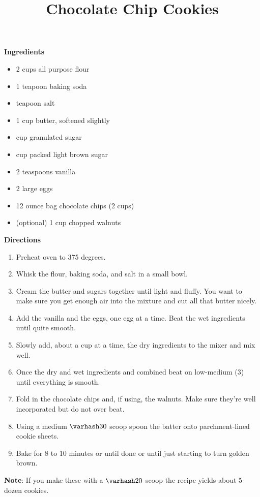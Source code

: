 \documentclass{article}
\title{Chocolate Chip Cookies}
\begin{document}
\textbf{Ingredients}

\begin{multicols}{2}

      \begin{itemize}
            \item 2 cups all purpose flour
            \item 1 teapoon baking soda
            \item {} teapoon salt

            \item 1 cup butter, softened slightly
            \item {} cup granulated sugar
            \item {} cup packed light brown sugar

            \item 2 teaspoons vanilla
            \item 2 large eggs
            \item 12 ounce bag chocolate chips (2 cups)
            \item (optional) 1 cup chopped walnuts
      \end{itemize}
\end{multicols}

\textbf{Directions}

\begin{enumerate}
      \item Preheat oven to 375 degrees.
      \item Whisk the flour, baking soda, and salt in a small bowl.
      \item Cream the butter and sugars together until light and fluffy. You want to make sure you get
            enough air into the mixture and cut all that butter nicely.
      \item Add the vanilla and the eggs, one egg at a time. Beat the wet ingredients until quite smooth.
      \item Slowly add, about a cup at a time, the dry ingredients to the mixer and mix well.
      \item Once the dry and wet ingredients and combined beat on low-medium (3) until
            everything is smooth.
      \item Fold in the chocolate chips and, if using, the walnuts. Make sure they're well
            incorporated but do not over beat.
      \item Using a medium $\varhash 30$ scoop spoon the batter onto parchment-lined cookie sheets.
      \item Bake for 8 to 10 minutes or until done or until just starting to turn golden brown.
\end{enumerate}

\medskip

\textbf{Note}: If you make these with a $\varhash 20$ scoop the recipe yields about 5 dozen cookies.

\end{document}
